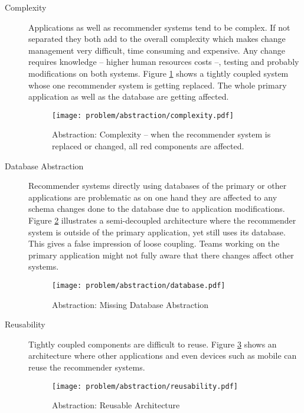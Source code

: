 \begin{description}

    \item[Complexity] Applications as well as recommender systems tend to be complex. If not separated they both add to the overall complexity which makes change management very difficult, time consuming and expensive. Any change requires knowledge -- higher human resources costs --, testing and probably modifications on both systems. Figure \ref{fig:abstraction-complexity} shows a tightly coupled system whose one recommender system is getting replaced. The whole primary application as well as the database are getting affected.

    \begin{figure}[H]
        \texttt{[image: problem/abstraction/complexity.pdf]}
        \caption[Abstraction: Complexity]{Abstraction: Complexity -- when the recommender system is replaced or changed, all red components are affected.}
        \label{fig:abstraction-complexity}
    \end{figure}

    \item[Database Abstraction] Recommender systems directly using databases of the primary or other applications are problematic as on one hand they are affected to any schema changes done to the database due to application modifications. Figure \ref{fig:abstraction-database} illustrates a semi-decoupled architecture where the recommender system is outside of the primary application, yet still uses its database. This gives a false impression of loose coupling. Teams working on the primary application might not fully aware that there changes affect other systems.

    \begin{figure}[H]
        \texttt{[image: problem/abstraction/database.pdf]}
        \caption{Abstraction: Missing Database Abstraction}
        \label{fig:abstraction-database}
    \end{figure}

    \item[Reusability] Tightly coupled components are difficult to reuse. Figure \ref{fig:abstraction-resuability} shows an architecture where other applications and even devices such as mobile can reuse the recommender systems.

    \begin{figure}[H]
        \texttt{[image: problem/abstraction/reusability.pdf]}
        \caption{Abstraction: Reusable Architecture}
        \label{fig:abstraction-resuability}
    \end{figure}


\end{description}
